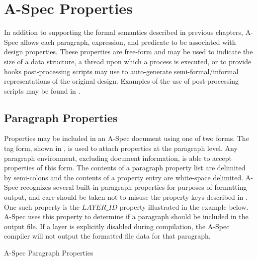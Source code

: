 \documentclass[letterpaper,10pt,draft]{book}
\begin{document}
\chapter{A-Spec Properties}
   \label{ch:Properties}

In addition to supporting the formal semantics described in previous chapters, A-Spec
allows each paragraph, expression, and predicate to be associated with design properties.
These properties are free-form and may be used to indicate the size of a data structure,
a thread upon which a process is executed, or to provide hooks post-processing scripts
may use to auto-generate semi-formal/informal representations of the original design.
Examples of the use of post-processing scripts may be found in .

\section{Paragraph Properties}
   \label{sect:ParProp}

Properties may be included in an A-Spec document using one of two forms.  The tag
form, shown in , is used to attach properties at the paragraph
level.  Any paragraph environment, excluding document information, is able to accept
properties of this form.  The contents of a paragraph property list are delimited
by semi-colons and the contents of a property entry are white-space delimited.
A-Spec recognizes several built-in paragraph properties for purposes of formatting
output, and care should be taken not to misuse the property keys described in .
One such property is the $LAYER\_ID$ property illustrated in the example below.
A-Spec uses this property to determine if a paragraph should be included in the
output file.  If a layer is explicitly disabled during compilation, the A-Spec compiler
will not output the formatted file data for that paragraph.

\def\LAYERIDgiftuubasket{1}
\begin{example}
\begin{minipage}[t]{0.49\linewidth}
   
\end{minipage}
\begin{minipage}[t]{0.49\linewidth}
   \azsch
   
\end{minipage}

   \caption{A-Spec Paragraph Properties}
   \label{ex:ParProp}
\end{example}
\def\LAYERIDgiftuubasket{0}
\end{document}
